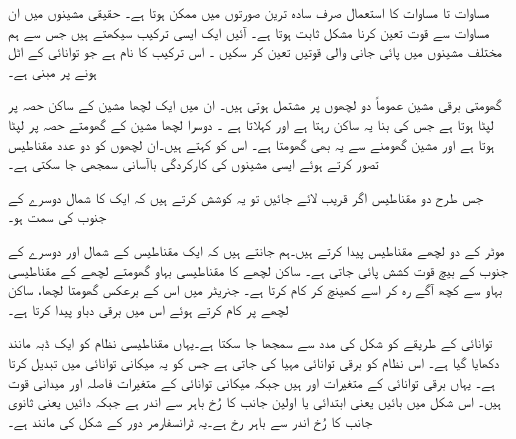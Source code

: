 مساوات  تا مساوات  کا استعمال صرف سادہ ترین صورتوں میں ممکن ہوتا ہے۔ حقیقی  مشینوں میں ان مساوات سے قوت  تعین کرنا مشکل ثابت ہوتا ہے۔ آئیں  ایک ایسی ترکیب  سیکھتے ہیں جس سے ہم  مختلف مشینوں میں پائی جانی والی  قوتیں  تعین کر سکیں ۔ اس ترکیب کا نام ہے  جو توانائی کے اٹل ہونے پر مبنی ہے۔

گھومتی برقی مشین عموماً دو لچھوں پر مشتمل ہوتی ہیں۔ ان میں ایک لچھا  مشین کے ساکن حصہ پر لپٹا ہوتا ہے جس کی بنا یہ ساکن رہتا ہے اور    کہلاتا ہے ۔  دوسرا لچھا  مشین کے گھومتے   حصہ پر لپٹا ہوتا ہے اور مشین گھومنے سے یہ بھی گھومتا ہے۔ اس کو   کہتے ہیں۔ان  لچھوں کو دو عدد مقناطیس تصور کرتے ہوئے ایسی مشینوں کی کارکردگی  باآسانی  سمجھی جا سکتی ہے۔

 جس طرح دو مقناطیس اگر قریب لائے جائیں تو یہ کوشش کرتے ہیں کہ ایک کا شمال  دوسرے کے جنوب  کی سمت  ہو۔

 موٹر کے دو  لچھے مقناطیس پیدا کرتے ہیں۔ہم جانتے ہیں کہ  ایک مقناطیس  کے شمال  اور دوسرے کے جنوب  کے بیچ قوت کشش پائی جاتی ہے۔ ساکن لچھے کا مقناطیسی بہاو  گھومتے لچھے کے مقناطیسی بہاو سے کچھ آگے رہ کر اسے کھینچ  کر  کام کرتا ہے۔ جنریٹر میں اس کے برعکس  گھومتا لچھا، ساکن لچھے پر کام کرتے ہوئے اس میں برقی دباو پیدا کرتا ہے۔

توانائی کے طریقے کو شکل   کی مدد سے سمجھا جا سکتا ہے۔یہاں مقناطیسی نظام کو ایک ڈبہ  مانند دکھایا گیا ہے۔ اس نظام کو برقی توانائی مہیا کی جاتی ہے جس کو یہ میکانی توانائی میں تبدیل کرتا ہے۔ یہاں برقی توانائی کے متغیرات   اور  ہیں جبکہ میکانی توانائی کے متغیرات فاصلہ  اور میدانی قوت  ہیں۔ اس شکل میں بائیں یعنی ابتدائی یا اولین جانب  کا رُخ باہر سے اندر ہے جبکہ  دائیں یعنی ثانوی جانب   کا رُخ اندر سے  باہر رخ ہے۔یہ  ٹرانسفارمر دور کے شکل   کی مانند ہے۔

